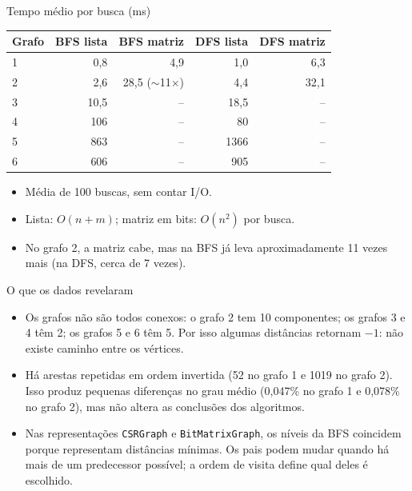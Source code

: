 \documentclass[10pt]{beamer}
\begin{document}
\begin{frame}{Tempo m\'edio por busca (ms)}
\begin{center}\small
\begin{tabular}{lrrrr}
\toprule
Grafo & BFS lista & BFS matriz & DFS lista & DFS matriz \\
\midrule
1 & 0,8 & 4,9 & 1,0 & 6,3 \\
2 & 2,6 & 28,5 ($\sim$11$\times$) & 4,4 & 32,1 \\
3 & 10,5 & -- & 18,5 & -- \\
4 & 106 & -- & 80 & -- \\
5 & 863 & -- & 1366 & -- \\
6 & 606 & -- & 905 & -- \\
\bottomrule
\end{tabular}
\end{center}
\begin{itemize}
\item M\'edia de 100 buscas, sem contar I/O.
\item Lista: $O(n+m)$; matriz em bits: $O(n^2)$ por busca.
\item No grafo 2, a matriz cabe, mas na BFS j\'a leva aproximadamente 11 vezes
mais (na DFS, cerca de 7 vezes).
\end{itemize}
\end{frame}

\begin{frame}{O que os dados revelaram}
\begin{itemize}
\item Os grafos n\~ao s\~ao todos conexos: o grafo 2 tem 10 componentes; os
grafos 3 e 4 t\^em 2; os grafos 5 e 6 t\^em 5. Por isso algumas dist\^ancias
retornam $-1$: n\~ao existe caminho entre os v\'ertices.
\item H\'a arestas repetidas em ordem invertida (52 no grafo 1 e 1019 no grafo 2).
Isso produz pequenas diferen\c cas no grau m\'edio (0,047\% no grafo 1 e 0,078\%
no grafo 2), mas n\~ao altera as conclus\~oes dos algoritmos.
\item Nas representa\c c\~oes \texttt{CSRGraph} e \texttt{BitMatrixGraph}, os
n\'iveis da BFS coincidem porque representam dist\^ancias m\'inimas. Os pais
podem mudar quando h\'a mais de um predecessor poss\'ivel; a ordem de visita
define qual deles \'e escolhido.
\end{itemize}
\end{frame}
\end{document}
